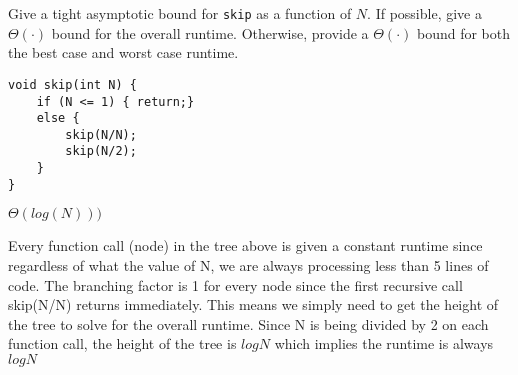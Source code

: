 \begin{blocksection}
\question Give a tight asymptotic bound for \lstinline$skip$ as a
function of $N$. If possible, give a $\Theta(\cdot)$ bound for the overall
runtime. Otherwise, provide a $\Theta(\cdot)$ bound for both the best case and
worst case runtime.

\begin{lstlisting}
void skip(int N) {
    if (N <= 1) { return;}
    else {
        skip(N/N);
        skip(N/2);
    }
}
\end{lstlisting}

\begin{solution}[0.5in]
$\Theta(log(N)))$
\begin{center}
\end{center}

Every function call (node) in the tree above is given a constant runtime since regardless of what the value of N, we are always processing less than 5 lines of code. The branching factor is 1 for every node since the first recursive call skip(N/N) returns immediately. This means we simply need to get the height of the tree to solve for the overall runtime. Since N is being divided by 2 on each function call, the height of the tree is $logN$ which implies the runtime is always $logN$

\end{solution}
\end{blocksection}